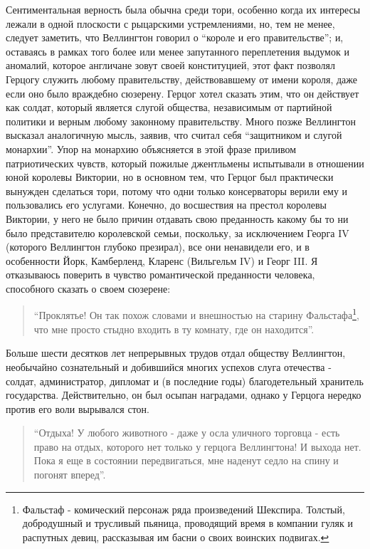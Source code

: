 \documentclass[
  oneside,
  12pt,
  titlepage]{book}
\begin{document}
Сентиментальная верность была обычна среди тори, особенно когда их интересы лежали в одной плоскости с рыцарскими устремлениями, но, тем не менее, следует заметить, что Веллингтон говорил о ``короле и его правительстве''; и, оставаясь в рамках того более или менее запутанного переплетения выдумок и аномалий, которое англичане зовут своей конституцией, этот факт позволял Герцогу служить любому правительству, действовавшему от имени короля, даже если оно было враждебно сюзерену. Герцог хотел сказать этим, что он действует как солдат, который является слугой общества, независимым от партийной политики и верным любому законному правительству. Много позже Веллингтон высказал аналогичную мысль, заявив, что считал себя ``защитником и слугой монархии''. Упор на монархию объясняется в этой фразе приливом патриотических чувств, который пожилые джентльмены испытывали в отношении юной королевы Виктории, но в основном тем, что Герцог был практически вынужден сделаться тори, потому что одни только консерваторы верили ему и пользовались его услугами. Конечно, до восшествия на престол королевы Виктории, у него не было причин отдавать свою преданность какому бы то ни было представителю королевской семьи, поскольку, за исключением Георга IV (которого Веллингтон глубоко презирал), все они ненавидели его, и в особенности Йорк, Камберленд, Кларенс (Вильгельм IV) и Георг III. Я отказываюсь поверить в чувство романтической преданности человека, способного сказать о своем сюзерене:

\begin{quote}
``Проклятье! Он так похож словами и внешностью на старину Фальстафа\footnote{Фальстаф - комический персонаж ряда произведений Шекспира. Толстый, добродушный и трусливый пьяница, проводящий время в компании гуляк и распутных девиц, рассказывая им басни о своих воинских подвигах.}, что мне просто стыдно входить в ту комнату, где он находится''.
\end{quote}

Больше шести десятков лет непрерывных трудов отдал обществу Веллингтон, необычайно сознательный и добившийся многих успехов слуга отечества - солдат, администратор, дипломат и (в последние годы) благодетельный хранитель государства. Действительно, он был осыпан наградами, однако у Герцога нередко против его воли вырывался стон.

\begin{quote}
``Отдыха! У любого животного - даже у осла уличного торговца - есть право на отдых, которого нет только у герцога Веллингтона! И выхода нет. Пока я еще в состоянии передвигаться, мне наденут седло на спину и погонят вперед''.
\end{quote}
\end{document}
